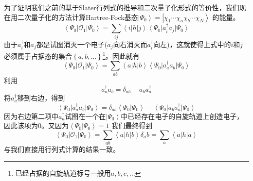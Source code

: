 \documentclass[12pt,a4paper,openany,twoside]{book}
\numberwithin{equation}{section}
\begin{document}
          为了证明我们之前的基于Slater行列式的推导和二次量子化形式的等价性，我们现在用二次量子化的方法计算Hartree-Fock基态$\left|\Psi_0\right\rangle=\left|\chi_1\cdots\chi_a\chi_b\cdots\chi_N\right\rangle$
          的能量。
          \begin{equation}
            \left\langle \Psi_0\right|\mathcal{O}_1\left|\Psi_0\right\rangle=
            \sum_{ij}\left\langle i\right| h\left| j\right\rangle\left\langle\Psi_0\right|
            a_i^\dagger a_j\left|\Psi_0\right\rangle
          \end{equation}
          由于$a_i^\dagger$和$a_j$都是试图消灭一个电子($a_j$向右消灭而$a_i^\dagger$向左)，这就使得上式中的$i$和$j$必须属于占据态的集合$\left\{a,b,\ldots\right\}$\footnote{已经占据的自旋轨道标号一般用$a,b,c,\dots$}。因此就有
          \begin{equation}
            \left\langle \Psi_0\right|\mathcal{O}_1\left|\Psi_0\right\rangle=
            \sum_{ab}\left\langle a\right| h\left| b\right\rangle\left\langle\Psi_0\right|
            a_a^\dagger a_b\left|\Psi_0\right\rangle
          \end{equation}
          利用
          \begin{equation}
            a_a^\dagger a_b=\delta_{ab}- a_b a_a^\dagger
          \end{equation}
          将$a_a^\dagger$移到右边，得到
          \begin{equation}
            \left\langle\Psi_0\right|a_a^\dagger a_b\left|\Psi_0\right\rangle=
            \delta_{ab}\left\langle\Psi_0\right|\left.\Psi_0\right\rangle
            -\left\langle\Psi_0\right|a_b a_a^\dagger\left|\Psi_0\right\rangle
          \end{equation}
          因为右边第二项中$a_a^\dagger$试图在一个在$\left|\Psi_0\right\rangle$中已经存在电子的自旋轨道上创造电子，因此该项为0。又因为$\left\langle\Psi_0\right.\left|\Psi_0\right\rangle=1$
          我们最终得到
          \begin{equation}
            \left\langle \Psi_0\right|\mathcal{O}_1\left|\Psi_0\right\rangle=
            \sum_{ab}\left\langle a\right| h\left| b\right\rangle\delta_ab=
            \sum_a\left\langle a\right| h\left| a\right\rangle
          \end{equation}
          与我们直接用行列式计算的结果一致。
          
\end{document}

